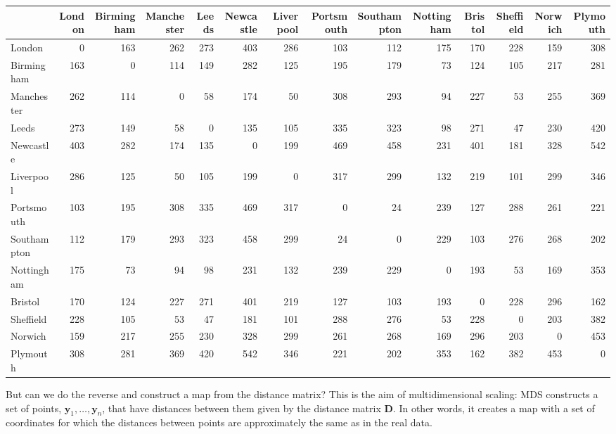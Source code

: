 \documentclass[]{book}
\theoremstyle{definition}
\theoremstyle{definition}
\theoremstyle{definition}
\theoremstyle{remark}
\begin{document}
\begin{table}[H]
\centering\begingroup\fontsize{7}{9}\selectfont

\begin{tabular}{lrrrrrrrrrrrrr}
\toprule
  & London & Birmingham & Manchester & Leeds & Newcastle & Liverpool & Portsmouth & Southampton & Nottingham & Bristol & Sheffield & Norwich & Plymouth\\
\midrule
London & 0 & 163 & 262 & 273 & 403 & 286 & 103 & 112 & 175 & 170 & 228 & 159 & 308\\
Birmingham & 163 & 0 & 114 & 149 & 282 & 125 & 195 & 179 & 73 & 124 & 105 & 217 & 281\\
Manchester & 262 & 114 & 0 & 58 & 174 & 50 & 308 & 293 & 94 & 227 & 53 & 255 & 369\\
Leeds & 273 & 149 & 58 & 0 & 135 & 105 & 335 & 323 & 98 & 271 & 47 & 230 & 420\\
Newcastle & 403 & 282 & 174 & 135 & 0 & 199 & 469 & 458 & 231 & 401 & 181 & 328 & 542\\
\addlinespace
Liverpool & 286 & 125 & 50 & 105 & 199 & 0 & 317 & 299 & 132 & 219 & 101 & 299 & 346\\
Portsmouth & 103 & 195 & 308 & 335 & 469 & 317 & 0 & 24 & 239 & 127 & 288 & 261 & 221\\
Southampton & 112 & 179 & 293 & 323 & 458 & 299 & 24 & 0 & 229 & 103 & 276 & 268 & 202\\
Nottingham & 175 & 73 & 94 & 98 & 231 & 132 & 239 & 229 & 0 & 193 & 53 & 169 & 353\\
Bristol & 170 & 124 & 227 & 271 & 401 & 219 & 127 & 103 & 193 & 0 & 228 & 296 & 162\\
\addlinespace
Sheffield & 228 & 105 & 53 & 47 & 181 & 101 & 288 & 276 & 53 & 228 & 0 & 203 & 382\\
Norwich & 159 & 217 & 255 & 230 & 328 & 299 & 261 & 268 & 169 & 296 & 203 & 0 & 453\\
Plymouth & 308 & 281 & 369 & 420 & 542 & 346 & 221 & 202 & 353 & 162 & 382 & 453 & 0\\
\bottomrule
\end{tabular}
\endgroup{}
\end{table}

But can we do the reverse and construct a map from the distance matrix? This is the aim of multidimensional scaling:
MDS constructs a set of points, \(\mathbf y_1, \ldots, \mathbf y_n\), that have distances between them given by the distance matrix \(\mathbf D\). In other words, it creates a map with a set of coordinates for which the distances between points are approximately the same as in the real data.
\end{document}
